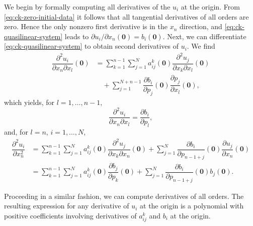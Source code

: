 \begin{Proof}We begin by formally computing all derivatives of the $u_i$ at the origin. From \eqref{eq:ck-zero-initial-data} it follows that all tangential derivatives of all orders are zero. Hence the only nonzero first derivative is in the $x_n$ direction, and \eqref{eq:ck-quasilinear-system} leads to $\partial u_i/\partial x_n(\bm{0})=b_i(\bm{0})$. Next, we can differentiate \eqref{eq:ck-quasilinear-system} to obtain second derivatives of $u_i$. We find
\begin{equation}\label{eq:ck-second-derivative-recurrence}
\begin{aligned}
\dfrac{\partial^2u_i}{\partial x_n\partial x_l}(\bm{0})
&=\sum_{k=1}^{n-1}\sum_{j=1}^Na_{ij}^k(\bm{0})\dfrac{\partial^2u_j}{\partial x_k\partial x_l}(\bm{0})\\
&\quad+\sum_{j=1}^{N+n-1}\dfrac{\partial b_i}{\partial p_j}(\bm{0})\dfrac{\partial p_j}{\partial x_l}(\bm{0}),
\end{aligned}
\end{equation}
which yields, for $l=1,\ldots,n-1$,
\begin{equation}\label{eq:ck-tangential-second-derivatives}
\dfrac{\partial^2u_i}{\partial x_n\partial x_l}=\dfrac{\partial b_i}{\partial p_l},
\end{equation}
and, for $l=n$, $i=1,\ldots,N$,
\begin{equation}\label{eq:ck-second-normal-derivative}
\begin{aligned}
\dfrac{\partial^2u_i}{\partial x_n^2}
&=\sum_{k=1}^{n-1}\sum_{j=1}^Na_{ij}^k(\bm{0})\dfrac{\partial^2u_j}{\partial x_k\partial x_n}(\bm{0})
+\sum_{j=1}^N\dfrac{\partial b_i}{\partial p_{n-1+j}}(\bm{0})\dfrac{\partial u_j}{\partial x_n}(\bm{0})\\
&=\sum_{k=1}^{n-1}\sum_{j=1}^Na_{ij}^k(\bm{0})\dfrac{\partial b_j}{\partial p_k}(\bm{0})
+\sum_{j=1}^N\dfrac{\partial b_i}{\partial p_{n-1+j}}(\bm{0})b_j(\bm{0}).
\end{aligned}
\end{equation}


Proceeding in a similar fashion, we can compute derivatives of all orders. The resulting expression for any derivative of $u_i$ at the origin is a polynomial with positive coefficients involving derivatives of $a_{ij}^k$ and $b_i$ at the origin.


\end{Proof}
